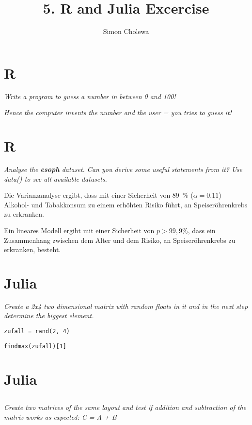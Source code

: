 \documentclass[11pt,a4paper]{article}
\author{Simon Cholewa}
\title{5. R and Julia Excercise}
\begin{document}
\maketitle

\section{R}
\textit{Write a program to guess a number in between 0 and 100!}

\textit{Hence the computer invents the number and the user = you tries to guess it! }



\newpage


\section{R}
\textit{Analyse the \textbf{esoph} dataset. Can you derive some useful statements from it? Use data() to see all available datasets. }



Die Varianzanalyse ergibt, dass mit einer Sicherheit von 89~\% ($\alpha = 0.11$) Alkohol- und Tabakkonsum zu einem erhöhten Risiko führt, an Speiseröhrenkrebs zu erkranken.

Ein lineares Modell ergibt mit einer Sicherheit von $p>99,9\%$, dass ein Zusammenhang zwischen dem Alter und dem Risiko, an Speiseröhrenkrebs zu erkranken, besteht.

\section{Julia}
\textit{Create a 2x4 two dimensional matrix with random floats in it and in the next step determine the biggest element.}

\texttt{zufall = rand(2, 4)}

\texttt{findmax(zufall)[1]}


\section{Julia}
\subsection{}
\textit{Create two matrices of the same layout and test if addition and subtraction of the matrix works as expected: C = A + B}
\end{document}
